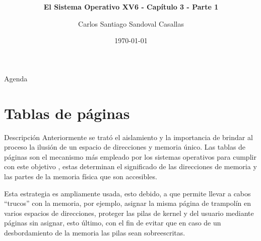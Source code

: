 \documentclass{libs/ufc_format}
\title[Sistemas Operativos]{\huge\textbf{}}
\subtitle{\textbf{El Sistema Operativo XV6 - Capítulo 3 - Parte 1}}
\author{Carlos Santiago Sandoval Casallas}
\institute[UNAL]{
  \normalsize{\email{csandovalc@unal.edu.co}}
  \newline
  \department{Departamento de Ingeniería de Sistemas e Industrial}
  \newline
  \ufc
}
\date{\today}
\begin{document}


\begin{frame}
  \maketitle
\end{frame}

\begin{frame}{Agenda}
  \tableofcontents
\end{frame}
\section{Tablas de páginas}
\begin{frame}{Descripción}
  Anteriormente se trató el aislamiento y la importancia de brindar al proceso la ilusión de un espacio de direcciones y memoria único. Las tablas de páginas son el mecanismo más empleado por los sistemas operativos para cumplir con este objetivo \cite{xv6_book}, estas determinan el significado de las direcciones de memoria y las partes de la memoria física que son accesibles.

  \vspace{0.3cm}

  Esta estrategia es ampliamente usada, esto debido, a que permite llevar a cabos “trucos” con la memoria, por ejemplo, asignar la misma página de trampolín en varios espacios de direcciones, proteger las pilas de kernel y del usuario mediante páginas sin asignar, esto último, con el fin de evitar que en caso de un desbordamiento de la memoria las pilas sean sobreescritas.
\end{frame}
\end{document}
